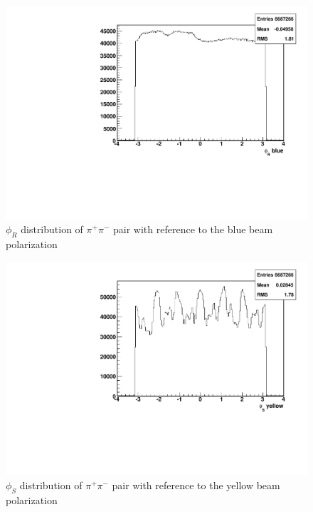 \documentclass[letterpaper, abstract = on,listof=totoc, bibliography=totoc]{scrreprt}
\newcommand{\phir}{\phi_{R}}
\newcommand{\phis}{\phi_{S}}
\newcommand{\pip}{\pi^+}
\newcommand{\pim}{\pi^-}
\newcommand{\pair}{$\pip\pim$ }
\begin{document}
\begin{figure}
\begin{center}
\includegraphics[width = .8\textwidth]{hPhiRb}
\caption[$\phir$ distribution of \pair pair with reference to the blue beam polarization]{$\phir$ distribution of \pair pair with reference to the blue beam polarization}
\label{fig:phirb}
\end{center}
\end{figure}


\begin{figure}
\begin{center}
\includegraphics[width = .8\textwidth]{hPhiSy}
\caption[$\phis$ distribution of \pair pair with reference to the yellow beam polarization]{$\phis$ distribution of \pair pair with reference to the yellow beam polarization}
\label{fig:phisy}
\end{center}
\end{figure}
\end{document}
